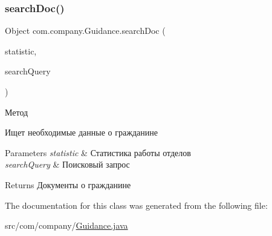 \subsubsection{\texorpdfstring{search\+Doc()}{searchDoc()}}
{\footnotesize\ttfamily Object com.\+company.\+Guidance.\+search\+Doc (\begin{DoxyParamCaption}\item[{Array\+List}]{statistic,  }\item[{String}]{search\+Query }\end{DoxyParamCaption})\hspace{0.3cm}{\ttfamily [inline]}}



Метод 

Ищет необходимые данные о гражданине 
\begin{DoxyParams}{Parameters}
{\em statistic} & Статистика работы отделов \\
\hline
{\em search\+Query} & Поисковый запрос \\
\hline
\end{DoxyParams}
\begin{DoxyReturn}{Returns}
Документы о гражданине 
\end{DoxyReturn}


The documentation for this class was generated from the following file\+:\begin{DoxyCompactItemize}
\item 
src/com/company/\mbox{\hyperlink{Guidance_8java}{Guidance.\+java}}\end{DoxyCompactItemize}
